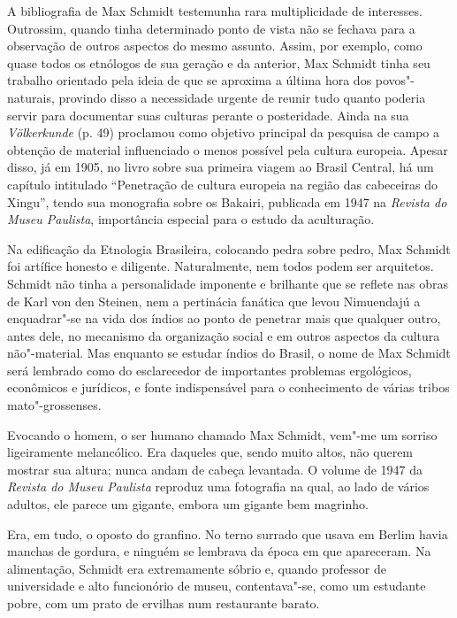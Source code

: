 A bibliografia de Max Schmidt testemunha rara multiplicidade de
interesses. Outrossim, quando tinha determinado ponto de vista não se
fechava para a observação de outros aspectos do mesmo assunto. Assim,
por exemplo, como quase todos os etnólogos de sua geração e da anterior,
Max Schmidt tinha seu trabalho orientado pela ideia de que se aproxima a
última hora dos povos"-naturais, provindo disso a necessidade urgente de
reunir tudo quanto poderia servir para documentar suas culturas perante
o posteridade. Ainda na sua \emph{Völkerkunde} (p. 49) proclamou como
objetivo principal da pesquisa de campo a obtenção de material
influenciado o menos possível pela cultura europeia. Apesar disso, já em
1905, no livro sobre sua primeira viagem ao Brasil Central, há um
capítulo intitulado ``Penetração de cultura europeia na região das
cabeceiras do Xingu'', tendo sua monografia sobre os Bakairi, publicada
em 1947 na \emph{Revista do Museu Paulista}, importância especial para o
estudo da aculturação.

Na edificação da Etnologia Brasileira, colocando pedra sobre pedro, Max
Schmidt foi artífice honesto e diligente. Naturalmente, nem todos podem
ser arquitetos. Schmidt não tinha a personalidade imponente e brilhante
que se reflete nas obras de Karl von den Steinen, nem a pertinácia
fanática que levou Nimuendajú a enquadrar"-se na vida dos índios ao ponto
de penetrar mais que qualquer outro, antes dele, no mecanismo da
organização social e em outros aspectos da cultura não"-material. Mas
enquanto se estudar índios do Brasil, o nome de Max Schmidt será
lembrado como do esclarecedor de importantes problemas ergológicos,
econômicos e jurídicos, e fonte indispensável para o conhecimento de
várias tribos mato"-grossenses.

\asterisc

Evocando o homem, o ser humano chamado Max Schmidt, vem"-me um sorriso
ligeiramente melancólico. Era daqueles que, sendo muito altos, não
querem mostrar sua altura; nunca andam de cabeça levantada. O volume de
1947 da \emph{Revista do Museu Paulista} reproduz uma fotografia na
qual, ao lado de vários adultos, ele parece um gigante, embora um
gigante bem magrinho.

Era, em tudo, o oposto do granfino. No terno surrado que usava em Berlim
havia manchas de gordura, e ninguém se lembrava da época em que
apareceram. Na alimentação, Schmidt era extremamente sóbrio e, quando
professor de universidade e alto funcionório de museu, contentava"-se,
como um estudante pobre, com um prato de ervilhas num restaurante
barato.

